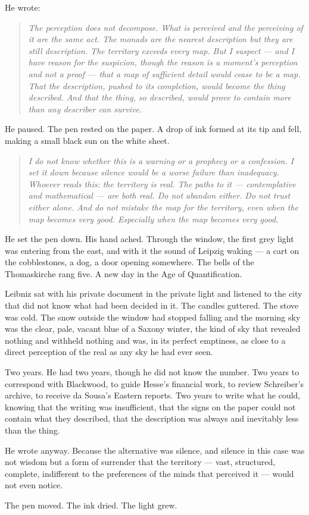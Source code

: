 He wrote:

\begin{quote}
\emph{The perception does not decompose. What is perceived and the perceiving of it are the same act. The monads are the nearest description but they are still description. The territory exceeds every map. But I suspect --- and I have reason for the suspicion, though the reason is a moment's perception and not a proof --- that a map of sufficient detail would cease to be a map. That the description, pushed to its completion, would become the thing described. And that the thing, so described, would prove to contain more than any describer can survive.}
\end{quote}

He paused. The pen rested on the paper. A drop of ink formed at its tip and fell, making a small black sun on the white sheet.

\begin{quote}
\emph{I do not know whether this is a warning or a prophecy or a confession. I set it down because silence would be a worse failure than inadequacy. Whoever reads this: the territory is real. The paths to it --- contemplative and mathematical --- are both real. Do not abandon either. Do not trust either alone. And do not mistake the map for the territory, even when the map becomes very good. Especially when the map becomes very good.}
\end{quote}

He set the pen down. His hand ached. Through the window, the first grey light was entering from the east, and with it the sound of Leipzig waking --- a cart on the cobblestones, a dog, a door opening somewhere. The bells of the Thomaskirche rang five. A new day in the Age of Quantification.

Leibniz sat with his private document in the private light and listened to the city that did not know what had been decided in it. The candles guttered. The stove was cold. The snow outside the window had stopped falling and the morning sky was the clear, pale, vacant blue of a Saxony winter, the kind of sky that revealed nothing and withheld nothing and was, in its perfect emptiness, as close to a direct perception of the real as any sky he had ever seen.

Two years. He had two years, though he did not know the number. Two years to correspond with Blackwood, to guide Hesse's financial work, to review Schreiber's archive, to receive da Sousa's Eastern reports. Two years to write what he could, knowing that the writing was insufficient, that the signs on the paper could not contain what they described, that the description was always and inevitably less than the thing.

He wrote anyway. Because the alternative was silence, and silence in this case was not wisdom but a form of surrender that the territory --- vast, structured, complete, indifferent to the preferences of the minds that perceived it --- would not even notice.

The pen moved. The ink dried. The light grew.

